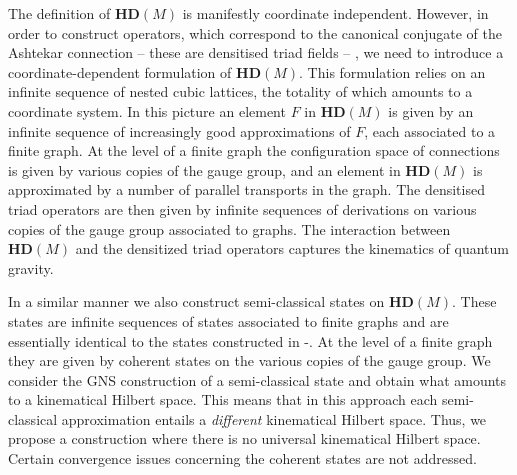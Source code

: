 \documentclass[12pt]{article}
\begin{document}
The definition of $\mathbf{HD}(M) $ is manifestly coordinate independent. However, in order to construct operators, which correspond to the canonical conjugate of the Ashtekar connection  --  these are densitised triad fields  --  , we need to introduce a coordinate-dependent formulation of $\mathbf{HD}(M) $. This formulation relies on an infinite sequence of nested cubic lattices, the totality of which amounts to a coordinate system. In this picture an element  $F$ in $\mathbf{HD}(M) $ is given by an infinite sequence of increasingly good approximations of $F$, each associated to a finite graph. At the level of a finite graph the configuration space of connections is given by various copies of the gauge group, and an element in $\mathbf{HD}(M) $ is approximated by a number of parallel transports in the graph.
The densitised triad operators are then given by infinite sequences of derivations on various copies of the gauge group associated to graphs.
The interaction between $\mathbf{HD}(M) $ and the densitized triad operators captures the kinematics of quantum gravity.



In a similar manner we also construct semi-classical states on $\mathbf{HD}(M) $. These states are infinite sequences of states associated to finite graphs and are essentially identical to the states constructed in \cite{AGNP1}-\cite{Aastrup:2011dt}. At the level of a finite graph they are given by coherent states on the various copies of the gauge group. We consider the GNS construction of a semi-classical state and obtain what amounts to a kinematical Hilbert space. This means that in this approach
each semi-classical approximation entails a {\it different} kinematical Hilbert space. Thus, we propose a construction where there is no universal kinematical Hilbert space. Certain convergence issues concerning the coherent states are not addressed.
\end{document}
